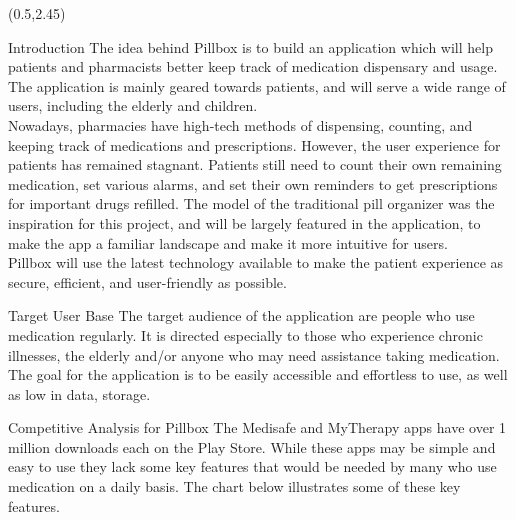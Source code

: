 \documentclass[22pt]{beamer}
\begin{document}
\begin{frame}[fragile]
\begin{textblock}{7.25}(0.5,2.45)
\vspace{2.5cm}
\begin{block}{Introduction}
The idea behind Pillbox is to build an application which will help patients and pharmacists better keep track of medication dispensary and usage. The application is mainly geared towards patients, and will serve a wide range of users, including the elderly and children. \\
Nowadays, pharmacies have high-tech methods of dispensing, counting, and keeping track of medications and prescriptions. However, the user experience for patients has remained stagnant. Patients still need to count their own remaining medication, set various alarms, and set their own reminders to get prescriptions for important drugs refilled. The model of the traditional pill organizer was the inspiration for this project, and will be largely featured in the application, to make the app a familiar landscape and make it more intuitive for users.\\
Pillbox will use the latest technology available to make the patient experience as secure, efficient, and user-friendly as possible.
\end{block}



\begin{block}{Target User Base}
The target audience of the application are people who use medication regularly. It is directed especially to those who experience chronic illnesses, the elderly and/or anyone who may need assistance taking medication. The goal for the application is to be easily accessible and effortless to use, as well as low in data, storage. 
\end{block}

\begin{block}{Competitive Analysis for Pillbox}
The Medisafe and MyTherapy apps have over 1 million downloads each on the Play Store. While these apps may be simple and easy to use they lack some key features that would be needed by many who use medication on a daily basis. The chart below illustrates some of these key features.


\end{block}
\end{textblock}
\end{frame}
\end{document}
